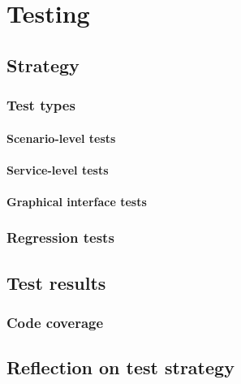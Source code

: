 \chapter{Testing}
\label{Testing}

\section{Strategy}
\label{Testing_Strategy}

\subsection{Test types}
\label{Testing_Strategy_Types}

\subsubsection{Scenario-level tests}
\label{Testing_Strategy_Types_Scenario}

\subsubsection{Service-level tests}
\label{Testing_Strategy_Types_Service}

\subsubsection{Graphical interface tests}
\label{Testing_Strategy_Types_EndUser}

\subsection{Regression tests}
\label{Testing_Strategy_Regression}

\section{Test results}
\label{Testing_Results}

\subsection{Code coverage}
\label{Testing_Results_Coverage}

\section{Reflection on test strategy}
\label{Testing_Reflection}